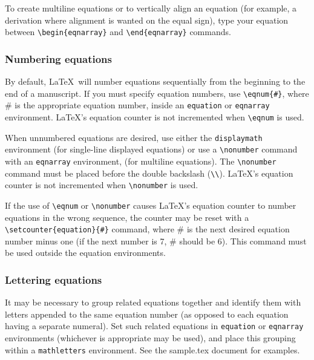 \begin{article}
To create multiline equations or to vertically align
an equation (for example, a derivation where alignment 
is wanted on the equal sign), type \linebreak 
your equation between \verb"\begin{eqnarray}" and \linebreak
\verb"\end{eqnarray}" commands.


\subsubsection{Numbering equations}

By default, \LaTeX\ will number equations sequentially 
from the beginning to the end of a manuscript.  If you 
must specify equation numbers, use \verb"\eqnum{#}", 
where \# is the appropriate equation number, inside 
an {\tt equation} or {\tt eqnarray} environment.
\LaTeX's equation counter is not incremented when 
\verb"\eqnum" is used.

When unnumbered equations are desired, use either the 
{\tt displaymath} environment (for single-line displayed
equations) or use a \verb"\nonumber" command with an 
{\tt eqnarray} environment, (for multiline equations).
The \verb"\nonumber" command must be placed before the 
double backslash (\verb"\\").  \LaTeX's equation counter
is not incremented when \verb"\nonumber" is used.

If the use of \verb"\eqnum" or \verb"\nonumber" causes 
\LaTeX's equation counter to number equations in the wrong 
sequence, the counter may be reset with a \linebreak
\verb"\setcounter{equation}{#}" command, where \#
is the next desired equation number minus one (if
the next number is 7, \# should be 6).  This 
command must be used outside the equation environments.


\subsubsection{Lettering equations}

It may be necessary to group related equations together 
and identify them with letters appended to the same 
equation number (as opposed to each equation having a 
separate numeral).  Set such related equations in 
{\tt equation} or {\tt eqnarray} environments 
(whichever is appropriate may be used), and place 
this grouping within a {\tt mathletters} environment.
See the sample.tex document for examples.



\end{article}
